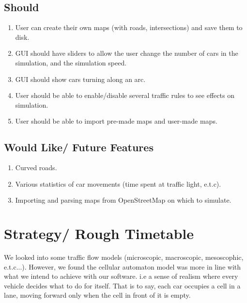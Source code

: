 \documentclass[11pt, a4]{article}
\begin{document}
\subsection{Should} \label{sub:should}
\begin{enumerate}[itemsep = -1ex]
\item User can create their own maps (with roads, intersections) and save them to disk.
\item GUI should have sliders to allow the user change the number of cars in the simulation, and the simulation speed.
\item GUI should show cars turning along an arc.
\item User should be able to enable/disable several traffic rules to see effects on simulation.
\item User should be able to import pre-made maps and user-made maps.
\end{enumerate}

\subsection{Would Like/ Future Features } \label{sub:would}
\begin{enumerate}[itemsep = -1ex]
\item Curved roads. 
\item Various statistics of car movements (time spent at traffic light, e.t.c).
\item Importing and parsing maps from OpenStreetMap on which to simulate.
\end {enumerate}

\section{Strategy/ Rough Timetable}\label{dev:meth}
\paragraph{}
We looked into some traffic flow models (microscopic, macroscopic, mesoscophic, e.t.c...). However, we found the cellular automaton model was more in line with what we intend to achieve with our software. i.e a sense of realism where every vehicle decides what to do for itself. That is to say, each car occupies a cell in a lane, moving forward only when the cell in front of it is empty.
\end{document}
